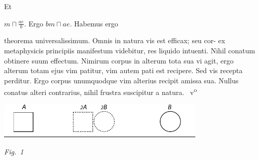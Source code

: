 Et 
\rule[0cm]{0mm}{14pt}$m \sqcap \displaystyle\frac{ae}{b}.$
Ergo $bm \sqcap ae.$ 
\pend
\pstart
\hspace{1mm}\hspace{-1mm}%
%
Habemus ergo 
\rule[0cm]{0mm}{12pt}theorema universalissimum. Omnis in natura vis est
efficax\protect{}; seu cor- 
\pend
\newpage
\pstart
\noindent ex metaphysicis
principiis manifestum videbitur, res liquido intuenti. Nihil 
%
conatum obtinere suum effectum.
Nimirum corpus in alterum tota sua vi agit, ergo alterum totam
ejus vim patitur, vim autem pati est recipere. Sed vis
%
%
recepta
perditur. Ergo corpus unumquodque vim alterius recipit amissa sua.
Nullus conatus alteri contrarius\protect{}, nihil frustra suscipitur a natura.%
~v\textsuperscript{o}\rbrack
\pend
\vspace{1.4em}
\centerline{\includegraphics[width=0.75\textwidth]{gesamttex/edit_VIII,3/images/LH_37_05_150-151_d1_150v.pdf}} 
\vspace{0.5em}
\centerline{\lbrack\textit{Fig.~1}\rbrack}
\vspace{1.2em}
\pstart
